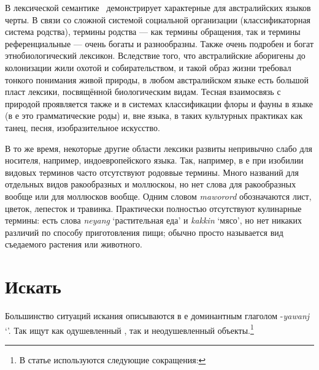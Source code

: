 
В лексической семантике \ демонстрирует характерные для австралийских языков черты. В связи со сложной системой социальной организации (классификаторная система родства), %
термины родства --- как термины обращения, так и термины референциальные --- %
очень богаты и разнообразны. Также очень подробен и богат этнобиологический лексикон. Вследствие того, что австралийские аборигены до колонизации жили охотой и собирательством, и такой образ жизни требовал тонкого понимания живой природы, в любом австралийском языке есть большой пласт лексики, посвящённой биологическим видам. Тесная взаимосвязь с природой проявляется также и в системах классификации флоры и фауны в языке (в  е это грамматические роды) и, вне языка, в таких культурных практиках как танец, песня, изобразительное искусство.

В то же время, некоторые другие области лексики развиты непривычно слабо для носителя, например, индоевропейского языка. Так, например, в  е при изобилии видовых терминов часто отсутствуют родоввые термины. Много названий для отдельных видов ракообразных и моллюскоы, но нет слова для ракообразных вообще или для моллюсков вообще. Одним словом \textit{maworord} обозначаются лист, цветок, лепесток и травинка. Практически полностью отсутствуют кулинарные термины: есть слова \textit{neyang} `растительная еда' и \textit{kakkin} `мясо', но нет никаких различий по способу приготовления пищи; обычно просто называется вид съедаемого растения или животного.


\section{Искать}
Большинство ситуаций искания описываются в  е доминантным глаголом -\textit{yawanj} `\yaw'. Так ищут как одушевленный , так и неодушевленный  объекты.\footnote{В статье используются следующие сокращения: \printglossary[style=inline,type=\leipzigtype]}

